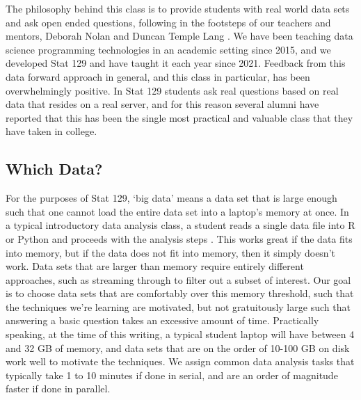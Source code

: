 \documentclass[12pt]{article}
\begin{document}
The philosophy behind this class is to provide students with real world data sets and ask open ended questions, following in the footsteps of our teachers and mentors, Deborah Nolan and Duncan Temple Lang \cite{nolan2010computing}.
We have been teaching data science programming technologies in an academic setting since 2015, and we developed Stat 129 and have taught it each year since 2021.
Feedback from this data forward approach in general, and this class in particular, has been overwhelmingly positive.
In Stat 129 students ask real questions based on real data that resides on a real server, and for this reason several alumni have reported that this has been the single most practical and valuable class that they have taken in college.

\subsection{Which Data?}

For the purposes of Stat 129, `big data' means a data set that is large enough such that one cannot load the entire data set into a laptop's memory at once.
In a typical introductory data analysis class, a student reads a single data file into R or Python and proceeds with the analysis steps \cite{dsbox}.
This works great if the data fits into memory, but if the data does not fit into memory, then it simply doesn't work.
Data sets that are larger than memory require entirely different approaches, such as streaming through to filter out a subset of interest.
Our goal is to choose data sets that are comfortably over this memory threshold, such that the techniques we're learning are motivated, but not gratuitously large such that answering a basic question takes an excessive amount of time.
Practically speaking, at the time of this writing, a typical student laptop will have between 4 and 32 GB of memory, and data sets that are on the order of 10-100 GB on disk work well to motivate the techniques.
We assign common data analysis tasks that typically take 1 to 10 minutes if done in serial, and are an order of magnitude faster if done in parallel.
\end{document}

